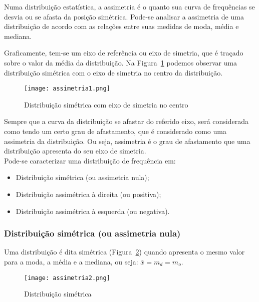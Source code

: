 \documentclass[11pt,fleqn]{book} %
\begin{document}
Numa distribuição estatística, a assimetria é o quanto sua curva de frequências se desvia ou se afasta da posição simétrica. Pode-se analisar a assimetria de uma distribuição de acordo com as relações entre suas medidas de moda, média e mediana.

Graficamente, tem-se um eixo de referência ou eixo de simetria, que é traçado sobre o valor da média da distribuição. Na Figura~\ref{fig:distsimetrica1} podemos observar uma distribuição simétrica com o eixo de simetria no centro da distribuição. \\

\begin{figure}[h!]
\centering\texttt{[image: assimetria1.png]}
\setlength{\abovecaptionskip}{0.5pt}
\caption{Distribuição simétrica com eixo de simetria no centro}
\label{fig:distsimetrica1} %
\end{figure}

Sempre que a curva da distribuição se afastar do referido eixo, será considerada como tendo um certo grau de afastamento, que é considerado como uma assimetria da distribuição. Ou seja, assimetria é o grau de afastamento que uma distribuição apresenta do seu eixo de simetria. \\

Pode-se caracterizar uma distribuição de frequência em:

\begin{itemize}
\item Distribuição simétrica (ou assimetria nula);
\item Distribuição assimétrica à direita (ou positiva);
\item Distribuição assimétrica à esquerda (ou negativa).\\
\end{itemize}


\subsubsection{Distribuição simétrica (ou assimetria nula)}
\vspace{0,1cm}

Uma distribuição é dita simétrica (Figura~\ref{fig:distsimetrica2}) quando apresenta o mesmo valor para a moda, a média e a mediana, ou seja: $\bar{x}=m_d=m_o$. \\

\begin{figure}[h!]
\centering\texttt{[image: assimetria2.png]}
\caption{Distribuição simétrica}
\label{fig:distsimetrica2} %
\end{figure}
\end{document}
